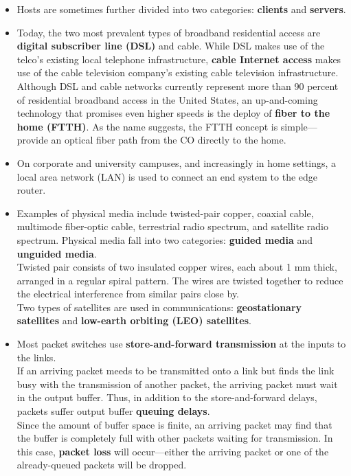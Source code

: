 \begin{itemize}
\item Hosts are sometimes further divided into two categories: \textbf{clients} and \textbf{servers}.

\item Today, the two most prevalent types of broadband residential access are \textbf{digital subscriber line (DSL)} and cable. While DSL makes use of the telco's existing local telephone infrastructure, \textbf{cable Internet access} makes use of the cable television company's existing cable television infrastructure.\\Although DSL and cable networks currently represent more than 90 percent of residential broadband access in the United States, an up-and-coming technology that promises even higher speeds is the deploy of \textbf{fiber to the home (FTTH)}. As the name suggests, the FTTH concept is simple---provide an optical fiber path from the CO directly to the home.

\item On corporate and university campuses, and increasingly in home settings, a local area network (LAN) is used to connect an end system to the edge router.

\item Examples of physical media include twisted-pair copper, coaxial cable, multimode fiber-optic cable, terrestrial radio spectrum, and satellite radio spectrum. Physical media fall into two categories: \textbf{guided media} and \textbf{unguided media}.\\Twisted pair consists of two insulated copper wires, each about 1 mm thick, arranged in a regular spiral pattern. The wires are twisted together to reduce the electrical interference from similar pairs close by.\\Two types of satellites are used in communications: \textbf{geostationary satellites} and \textbf{low-earth orbiting (LEO) satellites}.

\item Most packet switches use \textbf{store-and-forward transmission} at the inputs to the links.\\If an arriving packet meeds to be transmitted onto a link but finds the link busy with the transmission of another packet, the arriving packet must wait in the output buffer. Thus, in addition to the store-and-forward delays, packets suffer output buffer \textbf{queuing delays}.\\Since the amount of buffer space is finite, an arriving packet may find that the buffer is completely full with other packets waiting for transmission. In this case, \textbf{packet loss} will occur---either the arriving packet or one of the already-queued packets will be dropped.


\end{itemize}

